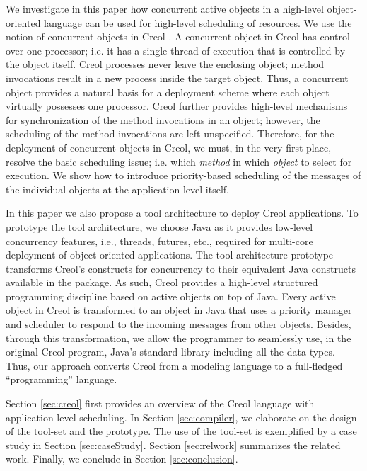We investigate in this paper how concurrent active objects in a high-level object-oriented
language can be used for high-level scheduling of resources. We use the notion of
concurrent objects in Creol \cite{creol:broch_owe,mpd:andrews}. A
concurrent object in Creol has control over one processor; i.e. it has a
single thread of execution that is controlled by the object itself.
Creol processes never leave the enclosing object; method invocations
result in a new process inside the target object.  Thus, a concurrent
object provides a natural basis for a deployment scheme where each
object virtually possesses one processor. Creol further provides high-level
mechanisms for synchronization of the method invocations in an object;
however, the scheduling of the method invocations are left
unspecified. Therefore, for the deployment of concurrent objects in
Creol, we must, in the very first place, resolve the
basic scheduling issue; i.e. which \textit{method} in which
\textit{object} to select for execution.
We show how to introduce priority-based scheduling of the messages of the individual objects
at the application-level itself.


In this paper we also propose a 
tool
architecture to deploy Creol applications. To prototype the tool
architecture, we choose Java as it provides low-level concurrency features, i.e., threads, futures, etc.,
required for multi-core deployment of object-oriented applications. The tool
architecture prototype transforms Creol's constructs for concurrency to their
equivalent Java constructs available in the
{} package. As such, Creol provides
a high-level structured programming discipline based on active objects on top of Java.
Every active object in Creol is transformed to an object in Java that uses a priority manager
and scheduler to respond to the incoming messages from other objects. Besides,
through this transformation, we allow the programmer to seamlessly use, in the
original Creol program, Java's standard library including all the data types.
Thus, our approach converts Creol from  a modeling language to a full-fledged
 ``programming'' language.

Section \ref{sec:creol} first provides an overview of the Creol language with application-level scheduling. 
In Section \ref{sec:compiler}, we elaborate on the design  of the tool-set and the
prototype. The use of the tool-set is exemplified by a case study in Section \ref{sec:caseStudy}.
Section \ref{sec:relwork} summarizes the related work. 
Finally, we conclude in Section \ref{sec:conclusion}.


